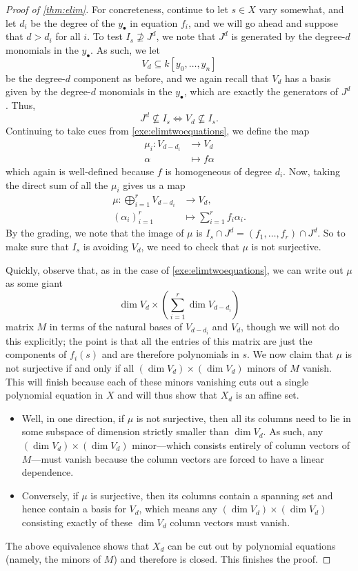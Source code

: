 \documentclass[../notes.tex]{subfiles}
\begin{document}
\begin{proof}[Proof of \autoref{thm:elim}]
	For concreteness, continue to let $s\in X$ vary somewhat, and let $d_i$ be the degree of the $y_\bullet$ in equation $f_i$, and we will go ahead and suppose that $d>d_i$ for all $i$. To test $I_s\not\supseteq J^d$, we note that $J^d$ is generated by the degree-$d$ monomials in the $y_\bullet$. As such, we let
	\[V_d\subseteq k[y_0,\ldots,y_n]\]
	be the degree-$d$ component as before, and we again recall that $V_d$ has a basis given by the degree-$d$ monomials in the $y_\bullet$, which are exactly the generators of $J^d$. Thus,
	\[J^d\not\subseteq I_s\iff V_d\not\subseteq I_s.\]
	Continuing to take cues from \autoref{exe:elimtwoequations}, we define the map
	\begin{align*}
		\mu_i\colon V_{d-d_i} &\to V_d \\
		\alpha &\mapsto f\alpha
	\end{align*}
	which again is well-defined because $f$ is homogeneous of degree $d_i$. Now, taking the direct sum of all the $\mu_i$ gives us a map
	\begin{align*}
		\mu\colon\bigoplus_{i=1}^rV_{d-d_i} &\to V_d, \\
		(\alpha_i)_{i=1}^r &\mapsto \sum_{i=1}^rf_i\alpha_i.
	\end{align*}
	By the grading, we note that the image of $\mu$ is $I_s\cap J^d=(f_1,\ldots,f_r)\cap J^d$. So to make sure that $I_s$ is avoiding $V_d$, we need to check that $\mu$ is not surjective.
	
	Quickly, observe that, as in the case of \autoref{exe:elimtwoequations}, we can write out $\mu$ as some giant
	\[\dim V_d\times\left(\sum_{i=1}^r\dim V_{d-d_i}\right)\]
	matrix $M$ in terms of the natural bases of $V_{d-d_i}$ and $V_d$, though we will not do this explicitly; the point is that all the entries of this matrix are just the components of $f_i(s)$ and are therefore polynomials in $s$. We now claim that $\mu$ is not surjective if and only if all $(\dim V_d)\times(\dim V_d)$ minors of $M$ vanish. This will finish because each of these minors vanishing cuts out a single polynomial equation in $X$ and will thus show that $X_d$ is an affine set.
	\begin{itemize}
		\item Well, in one direction, if $\mu$ is not surjective, then all its columns need to lie in some subspace of dimension strictly smaller than $\dim V_d$. As such, any $(\dim V_d)\times(\dim V_d)$ minor---which consists entirely of column vectors of $M$---must vanish because the column vectors are forced to have a linear dependence.
		\item Conversely, if $\mu$ is surjective, then its columns contain a spanning set and hence contain a basis for $V_d$, which means any $(\dim V_d)\times(\dim V_d)$ consisting exactly of these $\dim V_d$ column vectors must vanish.
	\end{itemize}
	The above equivalence shows that $X_d$ can be cut out by polynomial equations (namely, the minors of $M$) and therefore is closed. This finishes the proof.
\end{proof}
\end{document}

